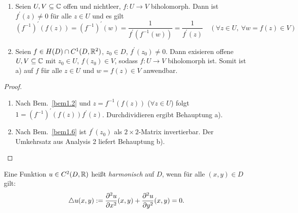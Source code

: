 \documentclass[a4paper,twoside,DIV15,BCOR12mm]{scrbook}
\begin{document}
\begin{satz} \label{satz1.8}
\begin{enumerate}
\item\label{satz1.8a} Seien $U, V \subseteq \mathbb{C}$ offen und nichtleer, $f\colon U \to V$ biholomorph. Dann ist $f^\prime(z)\neq 0$ für alle $z\in U$ und es gilt
\[(f^{-1})^\prime(f(z)) = (f^{-1})^\prime(w) = \frac{1}{f^\prime(f^{-1}(w))} = \frac{1}{f^\prime(z)} \quad (\forall z\in U,\ \forall w=f(z) \in V)\]
\item Seien $f\in H(D) \cap C^1(D, \mathbb{R}^2)$, $z_0\in D$, $f^\prime(z_0)\neq0$. Dann exisieren offene $U, V \subseteq \mathbb{C}$ mit $z_0\in U$, $f(z_0)\in V$, sodass $f\colon U \to V$ biholomorph ist. Somit ist a) auf $f$ für alle $z\in U$ und $w=f(z)\in V$ anwendbar.
\end{enumerate}
\end{satz}
\begin{proof}
\begin{enumerate}
\item Nach Bem.~\ref{bem1.2} und $z=f^{-1}(f(z))$ ($\forall z\in U$) folgt $1 = (f^{-1})^\prime(f(z))f^\prime(z)$. Durchdividieren ergibt Behauptung a).
\item Nach Bem.~\ref{bem1.6} ist $f^\prime(z_0)$ als $2\times2$-Matrix invertierbar. Der Umkehrsatz aus Analysis 2 liefert Behauptung b).\qedhere
\end{enumerate}
\end{proof}

\begin{dfn*} Eine Funktion $u\in C^2(D, \mathbb{R})$ heißt \emph{harmonisch} auf $D$, wenn für alle $(x, y) \in D$ gilt:
\[\triangle u(x, y) := \frac{\partial^2u}{\partial x^2}(x, y) + \frac{\partial^2u}{\partial y^2}(x, y) = 0.\]
\end{dfn*}
\end{document}
